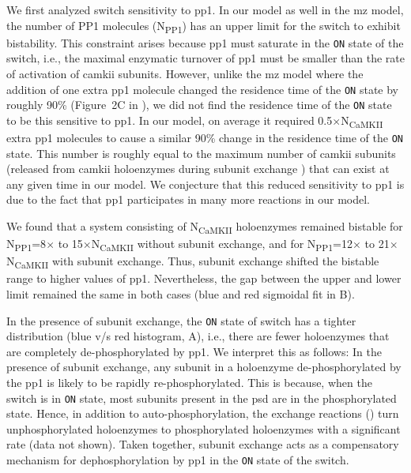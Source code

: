 \documentclass[9pt,lineno,doublespacing]{elife}
\newcommand\SUB[2]{#1\textsubscript{#2}}
\begin{document}
We first analyzed switch sensitivity to \gls{pp1}. In our model as well in the
\gls{mz} model, the number of PP1 molecules (\SUB{N}{PP1}) has an upper limit
for the switch to exhibit bistability. This constraint arises because \gls{pp1}
must saturate in the \texttt{ON} state of the switch, i.e., the maximal
enzymatic turnover of \gls{pp1} must be smaller than the rate of activation of
\gls{camkii} subunits. However, unlike the \gls{mz} model where the addition of
one extra \gls{pp1} molecule changed the residence time of the \texttt{ON} state by
roughly 90\% (Figure~2C in \citep{miller_stability_2005}), we did not find the
residence time of the \texttt{ON} state to be this sensitive to \gls{pp1}. In our
model, on average it required 0.5$\times$\SUB{N}{CaMKII} extra \gls{pp1}
molecules to cause a similar 90\% change in the residence time of the \texttt{ON}
state.  This number is roughly equal to the maximum number of \gls{camkii}
subunits (released from \gls{camkii} holoenzymes during subunit exchange
) that can exist at any given time in our model. We conjecture
that this reduced sensitivity to \gls{pp1} is due to the fact that \gls{pp1}
participates in many more reactions in our model. 

We found that a system consisting of \SUB{N}{CaMKII} holoenzymes remained
bistable for \SUB{N}{PP1}=8$\times$ to 15$\times$\SUB{N}{CaMKII} without subunit
exchange, and for \SUB{N}{PP1}=12$\times$ to 21$\times$\SUB{N}{CaMKII} with
subunit exchange. Thus, subunit exchange shifted the bistable range to higher
values of \gls{pp1}. Nevertheless, the gap between the upper and lower limit remained
the same in both cases (blue and red sigmoidal fit in B).

In the presence of subunit exchange, the \texttt{ON} state of switch has a
tighter distribution (blue v/s red histogram, A), i.e., there
are fewer holoenzymes that are completely de-phosphorylated by \gls{pp1}. We
interpret this as follows: In the presence of subunit exchange, any subunit in a
holoenzyme de-phosphorylated by the \gls{pp1} is likely to be rapidly
re-phosphorylated. This is because, when the switch is in \texttt{ON} state,
most subunits present in the \gls{psd} are in the phosphorylated state. Hence,
in addition to auto-phosphorylation, the exchange reactions ()
turn unphosphorylated holoenzymes to phosphorylated holoenzymes with a
significant rate (data not shown). Taken together, subunit exchange acts as a
compensatory mechanism for dephosphorylation by \gls{pp1} in the \texttt{ON}
state of the switch.
\end{document}

